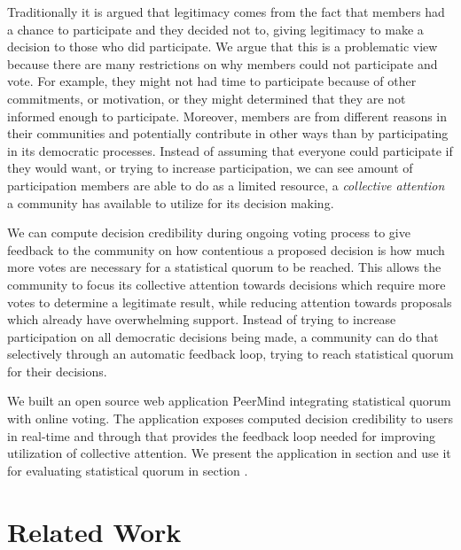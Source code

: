\documentclass[chi_draft]{sigchi}
\newcommand\secref[1]{section \textit{\nameref{#1}}}
\begin{document}
Traditionally it is argued that legitimacy comes from the fact that members had a chance to participate
and they decided not to, giving legitimacy to make a decision to those who did participate.
We argue that this is a problematic view because there are many restrictions on why members could not
participate and vote.
For example, they might not had time to participate because of other commitments, or motivation, or they might determined
that they are not informed enough to participate.
Moreover, members are from different reasons in their communities and potentially contribute in other ways
than by participating in its democratic processes.
Instead of assuming that everyone could participate if they would want, or trying to increase participation,
we can see amount of participation members are able to do as a limited resource, a \emph{collective attention}
a community has available to utilize for its decision making.

We can compute decision credibility during ongoing voting process to give feedback to the community
on how contentious a proposed decision is how much more votes are necessary for a statistical quorum
to be reached.
This allows the community to focus its collective attention towards decisions which require more votes
to determine a legitimate result, while reducing attention towards proposals which already have overwhelming support.
Instead of trying to increase participation on all democratic decisions being made, a community can
do that selectively through an automatic feedback loop, trying to reach statistical quorum for their decisions.

We built an open source web application PeerMind integrating statistical quorum with online voting.
The application exposes computed decision credibility to users in real-time and through that provides
the feedback loop needed for improving utilization of collective attention.
We present the application in \secref{sec:peermind} and use it for evaluating statistical quorum in
\secref{sec:evaluation}.



\section{Related Work}
\end{document}
